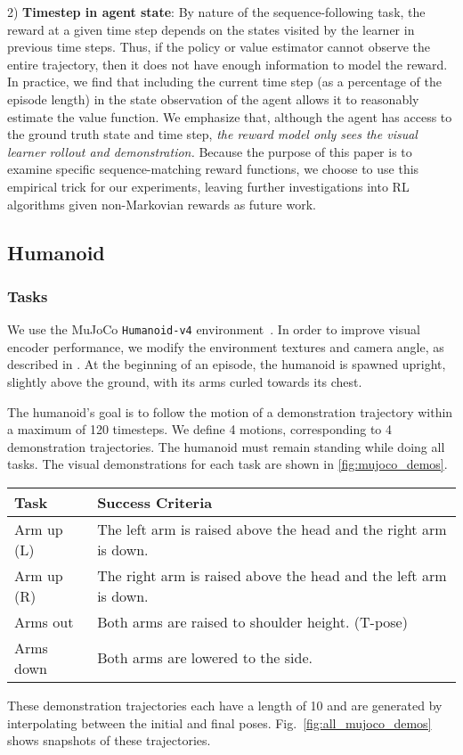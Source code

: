 2) \textbf{Timestep in agent state}: By nature of the sequence-following task, the reward at a given time step depends on the states visited by the learner in previous time steps. Thus, if the policy or value estimator cannot observe the entire trajectory, then it does not have enough information to model the reward. In practice, we find that including the current time step (as a percentage of the episode length) in the state observation of the agent allows it to reasonably estimate the value function. We emphasize that, although the agent has access to the ground truth state and time step, \textit{the reward model only sees the visual learner rollout and demonstration.} Because the purpose of this paper is to examine specific sequence-matching reward functions, we choose to use this empirical trick for our experiments, leaving further investigations into RL algorithms given non-Markovian rewards as future work.


\subsection{Humanoid}
\subsubsection{Tasks}

We use the MuJoCo \texttt{Humanoid-v4} environment~\citep{mujoco,humanoidgym}. In order to improve visual encoder performance, we modify the environment textures and camera angle, as described in \cite{rocamonde2024visionlanguage}. At the beginning of an episode, the humanoid is spawned upright, slightly above the ground, with its arms curled towards its chest. 


The humanoid’s goal is to follow the motion of a demonstration trajectory within a maximum of 120 timesteps. We define 4 motions, corresponding to 4 demonstration trajectories. The humanoid must remain standing while doing all tasks. The visual demonstrations for each task are shown in \ref{fig:mujoco_demos}.
\begin{table}[h]
\centering
\begin{tabular}{ll}
\toprule
\textbf{Task} & \textbf{Success Criteria} \\
\midrule
Arm up (L) & The left arm is raised above the head and the right arm is down. \\
Arm up (R) & The right arm is raised above the head and the left arm is down. \\
Arms out & Both arms are raised to shoulder height. (T-pose) \\
Arms down & Both arms are lowered to the side. \\
\bottomrule
\end{tabular}
\end{table}
These demonstration trajectories each have a length of 10 and are generated by interpolating between the initial and final poses.
Fig.~\ref{fig:all_mujoco_demos} shows snapshots of these trajectories. 

